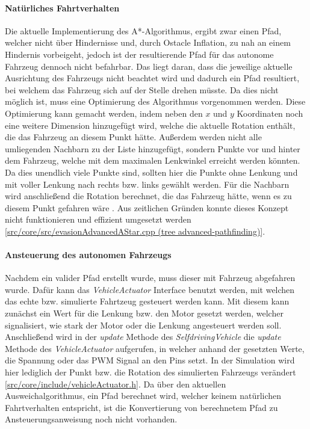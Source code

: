 \paragraph{Natürliches Fahrtverhalten} \mbox{}

Die aktuelle Implementierung des A*-Algorithmus, ergibt zwar einen Pfad, welcher nicht über Hindernisse und, durch Ostacle Inflation, zu nah an einem Hindernis vorbeigeht, jedoch ist der resultierende Pfad für das autonome Fahrzeug dennoch nicht befahrbar. Das liegt daran, dass die jeweilige aktuelle Ausrichtung des Fahrzeugs nicht beachtet wird und dadurch ein Pfad resultiert, bei welchem das Fahrzeug sich auf der Stelle drehen müsste. Da dies nicht möglich ist, muss eine Optimierung des Algorithmus vorgenommen werden. Diese Optimierung kann gemacht werden, indem neben den \(x\) und \(y\) Koordinaten noch eine weitere Dimension hinzugefügt wird, welche die aktuelle Rotation enthält, die das Fahrzeug an diesem Punkt hätte. Außerdem werden nicht alle umliegenden Nachbarn zu der Liste hinzugefügt, sondern Punkte vor und hinter dem Fahrzeug, welche mit dem maximalen Lenkwinkel erreicht werden könnten. Da dies unendlich viele Punkte sind, sollten hier die Punkte ohne Lenkung und mit voller Lenkung nach rechts bzw. links gewählt werden. Für die Nachbarn wird anschließend die Rotation berechnet, die das Fahrzeug hätte, wenn es zu diesem Punkt gefahren wäre \cite{restricted_pathfindng_2017}. Aus zeitlichen Gründen konnte dieses Konzept nicht funktionieren und effizient umgesetzt werden [\href{https://github.com/Jundy0/Studienarbeit/blob/advanced-pathfinding/src/core/src/evasionAdvancedAStar.cpp}{src/core/src/evasionAdvancedAStar.cpp (tree advanced-pathfinding)}]. 

\paragraph{Ansteuerung des autonomen Fahrzeugs} \mbox{}

Nachdem ein valider Pfad erstellt wurde, muss dieser mit Fahrzeug abgefahren wurde. Dafür kann das \textit{VehicleActuator} Interface benutzt werden, mit welchen das echte bzw. simulierte Fahrtzeug gesteuert werden kann. Mit diesem kann zunächst ein Wert für die Lenkung bzw. den Motor gesetzt werden, welcher signalisiert, wie stark der Motor oder die Lenkung angesteuert werden soll. Anschließend wird in der \textit{update} Methode des \textit{SelfdrivingVehicle} die \textit{update} Methode des \textit{VehicleActuator} aufgerufen, in welcher anhand der gesetzten Werte, die Spannung oder das PWM Signal an den Pins setzt. In der Simulation wird hier lediglich der Punkt bzw. die Rotation des simulierten Fahrzeugs  verändert [\href{https://github.com/Jundy0/Studienarbeit/blob/main/src/core/include/vehicleActuator.h}{src/core/include/vehicleActuator.h}]. Da über den aktuellen Ausweichalgorithmus, ein Pfad berechnet wird, welcher keinem natürlichen Fahrtverhalten entspricht, ist die Konvertierung von berechnetem Pfad zu Ansteuerungsanweisung noch nicht vorhanden. 

\newpage
